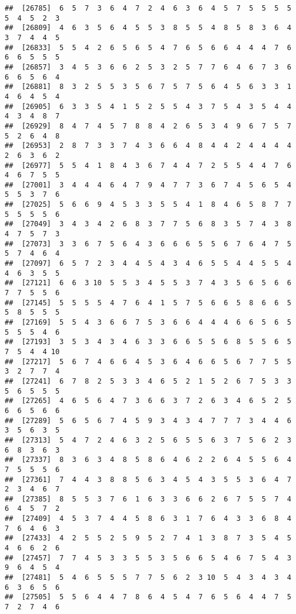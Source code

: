 \documentclass[
]{book}
\begin{document}
\begin{verbatim}
##  [26785]  6  5  7  3  6  4  7  2  4  6  3  6  4  5  7  5  5  5  5  5  4  5  2  3
##  [26809]  4  6  3  5  6  4  5  5  3  8  5  5  4  8  5  8  3  6  4  3  7  4  4  5
##  [26833]  5  5  4  2  6  5  6  5  4  7  6  5  6  6  4  4  4  7  6  6  6  5  5  5
##  [26857]  3  4  5  3  6  6  2  5  3  2  5  7  7  6  4  6  7  3  6  6  6  5  6  4
##  [26881]  8  3  2  5  5  3  5  6  7  5  7  5  6  4  5  6  3  3  1  4  6  4  5  4
##  [26905]  6  3  3  5  4  1  5  2  5  5  4  3  7  5  4  3  5  4  4  4  3  4  8  7
##  [26929]  8  4  7  4  5  7  8  8  4  2  6  5  3  4  9  6  7  5  7  5  2  6  4  8
##  [26953]  2  8  7  3  3  7  4  3  6  6  4  8  4  4  2  4  4  4  4  2  6  3  6  2
##  [26977]  5  5  4  1  8  4  3  6  7  4  4  7  2  5  5  4  4  7  6  4  6  7  5  5
##  [27001]  3  4  4  4  6  4  7  9  4  7  7  3  6  7  4  5  6  5  4  5  5  3  7  6
##  [27025]  5  6  6  9  4  5  3  3  5  5  4  1  8  4  6  5  8  7  7  5  5  5  5  6
##  [27049]  3  4  3  4  2  6  8  3  7  7  5  6  8  3  5  7  4  3  8  4  7  5  7  3
##  [27073]  3  3  6  7  5  6  4  3  6  6  6  5  5  6  7  6  4  7  5  5  7  4  6  4
##  [27097]  6  5  7  2  3  4  4  5  4  3  4  6  5  5  4  4  5  5  4  4  6  3  5  5
##  [27121]  6  6  3 10  5  5  3  4  5  5  3  7  4  3  5  6  5  6  6  7  7  5  5  6
##  [27145]  5  5  5  5  4  7  6  4  1  5  7  5  6  6  5  8  6  6  5  5  8  5  5  5
##  [27169]  5  5  4  3  6  6  7  5  3  6  6  4  4  4  6  6  5  6  5  5  5  5  4  6
##  [27193]  3  5  3  4  3  4  6  3  3  6  6  5  5  6  8  5  5  6  5  7  5  4  4 10
##  [27217]  5  6  7  4  6  6  4  5  3  6  4  6  6  5  6  7  7  5  5  3  2  7  7  4
##  [27241]  6  7  8  2  5  3  3  4  6  5  2  1  5  2  6  7  5  3  3  5  6  5  5  5
##  [27265]  4  6  5  6  4  7  3  6  6  3  7  2  6  3  4  6  5  2  5  6  6  5  6  6
##  [27289]  5  6  5  6  7  4  5  9  3  4  3  4  7  7  7  3  4  4  6  3  5  6  3  5
##  [27313]  5  4  7  2  4  6  3  2  5  6  5  5  6  3  7  5  6  2  3  6  8  3  6  3
##  [27337]  8  3  6  3  4  8  5  8  6  4  6  2  2  6  4  5  5  6  4  7  5  5  5  6
##  [27361]  7  4  4  3  8  8  5  6  3  4  5  4  3  5  5  3  6  4  7  2  3  4  6  7
##  [27385]  8  5  5  3  7  6  1  6  3  3  6  6  2  6  7  5  5  7  4  6  4  5  7  2
##  [27409]  4  5  3  7  4  4  5  8  6  3  1  7  6  4  3  3  6  8  4  7  6  4  6  3
##  [27433]  4  2  5  5  2  5  9  5  2  7  4  1  3  8  7  3  5  4  5  4  6  6  2  6
##  [27457]  7  7  4  5  3  3  5  5  3  5  6  6  5  4  6  7  5  4  3  9  6  4  5  4
##  [27481]  5  4  6  5  5  5  7  7  5  6  2  3 10  5  4  3  4  3  4  6  3  6  5  6
##  [27505]  5  5  6  4  4  7  8  6  4  5  4  7  6  5  6  4  4  7  5  7  2  7  4  6

\end{verbatim}
\end{document}
